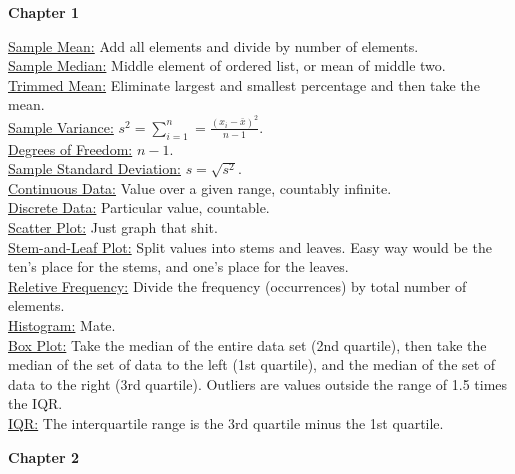 \documentclass[9pt]{article}
\newcommand*\mean[1]{\bar{#1}}
\begin{document}
    \noindent\textbf{Chapter 1}
        \begin{multicols}{2}
            \noindent\underline{Sample Mean:} Add all elements and divide by number of elements.\\
            \underline{Sample Median:} Middle element of ordered list, or mean of middle two.\\
            \underline{Trimmed Mean:} Eliminate largest and smallest percentage and then take the mean.\\
            \underline{Sample Variance:} $s^2 = \sum_{i=1}^{n}=\frac{(x_i-\mean{x})^2}{n-1}$.\\
            \underline{Degrees of Freedom:} $n-1$.\\
            \underline{Sample Standard Deviation:} $s = \sqrt{s^2}$.\\
            \underline{Continuous Data:} Value over a given range, countably infinite.\\
            \underline{Discrete Data:} Particular value, countable.\\
            \underline{Scatter Plot:} Just graph that shit.\\
            \underline{Stem-and-Leaf Plot:} Split values into stems and leaves. Easy way would be the ten's place for the stems, and one's place for the leaves.\\
            \underline{Reletive Frequency:} Divide the frequency (occurrences) by total number of elements.\\
            \underline{Histogram:} Mate.\\
            \underline{Box Plot:} Take the median of the entire data set (2nd quartile), then take the median of the set of data to the left (1st quartile), and the median of the set of data to the right (3rd quartile). Outliers are values outside the range of 1.5 times the IQR.\\
            \underline{IQR:} The interquartile range is the 3rd quartile minus the 1st quartile.
        \end{multicols}
    \noindent\textbf{Chapter 2}
\end{document}
